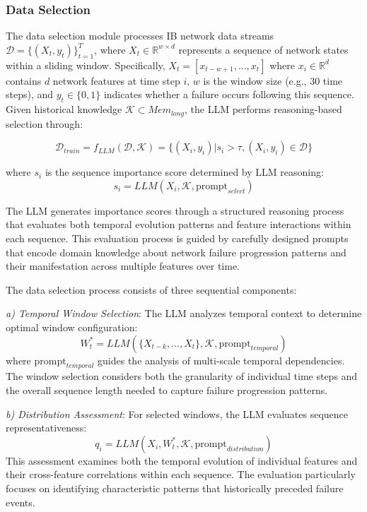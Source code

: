 \documentclass[conference]{IEEEtran}
\begin{document}
\subsubsection{Data Selection}
The data selection module processes IB network data streams $\mathcal{D} = \{(X_t, y_t)\}_{t=1}^T$, where $X_t \in \mathbb{R}^{w \times d}$ represents a sequence of network states within a sliding window. Specifically, $X_t = [x_{t-w+1}, ..., x_t]$ where $x_i \in \mathbb{R}^d$ contains $d$ network features at time step $i$, $w$ is the window size (e.g., 30 time steps), and $y_t \in \{0,1\}$ indicates whether a failure occurs following this sequence. Given historical knowledge $\mathcal{K} \subset Mem_{long}$, the LLM performs reasoning-based selection through:

\begin{equation}
    \mathcal{D}_{train} = f_{LLM}(\mathcal{D}, \mathcal{K}) = \{(X_i, y_i) | s_i > \tau, (X_i, y_i) \in \mathcal{D}\}
\end{equation}

where $s_i$ is the sequence importance score determined by LLM reasoning:
\begin{equation}
    s_i = LLM(X_i, \mathcal{K}, \text{prompt}_{select})
\end{equation}

The LLM generates importance scores through a structured reasoning process that evaluates both temporal evolution patterns and feature interactions within each sequence. This evaluation process is guided by carefully designed prompts that encode domain knowledge about network failure progression patterns and their manifestation across multiple features over time.

The data selection process consists of three sequential components:

\textit{a) Temporal Window Selection}: The LLM analyzes temporal context to determine optimal window configuration:
\begin{equation}
    W_t^* = LLM(\{X_{t-k}, ..., X_t\}, \mathcal{K}, \text{prompt}_{temporal})
\end{equation}
where $\text{prompt}_{temporal}$ guides the analysis of multi-scale temporal dependencies. The window selection considers both the granularity of individual time steps and the overall sequence length needed to capture failure progression patterns.

\textit{b) Distribution Assessment}: For selected windows, the LLM evaluates sequence representativeness:
\begin{equation}
    q_i = LLM(X_i, W_t^*, \mathcal{K}, \text{prompt}_{distribution})
\end{equation}
This assessment examines both the temporal evolution of individual features and their cross-feature correlations within each sequence. The evaluation particularly focuses on identifying characteristic patterns that historically preceded failure events.
\end{document}
